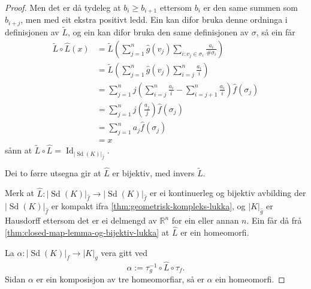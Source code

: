 \documentclass[a4paper, 12pt, norsk]{article}
\theoremstyle{plain}
\theoremstyle{definition}
\newcommand{\Rb}{\mathbb{R}}
\newcommand{\gr}[1]{ \lvert #1 \rvert } %
\newcommand{\tuple}[1]{ \left( #1 \right) } %
\DeclareMathOperator{\Sd}{Sd} %
\DeclareMathOperator{\Id}{Id} %
\begin{document}
\begin{proof}
	Men det er då tydeleg at \( b_i \geq b_{i+1} \) ettersom \( b_i \) er den same summen som \( b_{i+j} \), men med eit ekstra positivt ledd. Ein kan difor bruka denne ordninga i definisjonen av \( \tilde{L} \), og ein kan difor bruka den same definisjonen av \( \sigma \), så ein får
	\begin{align*}
		\tilde{L}\circ\hat{L}(x) &= \tilde{L}\tuple{\sum_{j=1}^n \hat{g}(v_j) \sum_{i:v_j\in\sigma_i}\frac{a_i}{\#\sigma_i}} \\
		&= \tilde{L}\tuple{\sum_{j=1}^n \hat{g}(v_j) \sum_{i=j}^n \frac{a_i}{i}} \\
		&= \sum_{j=1}^n j\tuple{\sum_{i=j}^n \frac{a_i}{i} - \sum_{i=j+1}^n \frac{a_i}{i}}\hat{f}(\sigma_j) \\
		&= \sum_{j=1}^n j\tuple{\frac{a_j}{j}}\hat{f}(\sigma_j) \\
		&= \sum_{j=1}^n a_j \hat{f}(\sigma_j) \\
		&= x
	\end{align*}
	sånn at \( \tilde{L}\circ\hat{L} = \Id_{\gr{\Sd(K)}_{\hat{f}}} \). 
	
	Dei to førre utsegna gir at \( \hat{L} \) er bijektiv, med invers \( \tilde{L} \).

	Merk at \( \hat{L}: \gr{\Sd(K)}_{\hat{f}} \to \gr{\Sd(K)}_{\hat{f}} \) er ei kontinuerleg og bijektiv avbilding der \( \gr{\Sd(K)}_{\hat{f}} \) er kompakt ifra \autoref{thm:geometrisk-kompleks-lukka}, og \( \gr{K}_{\hat{g}} \) er Hausdorff ettersom det er ei delmengd av \( \Rb^n \) for ein eller annan \( n \). Ein får då frå \autoref{thm:closed-map-lemma-og-bijektiv-lukka} at \( \hat{L} \) er ein homeomorfi.

	La \( \alpha: \gr{\Sd(K)}_f \to \gr{K}_g \) vera gitt ved
	\[
		\alpha := \tau_g^{-1} \circ \hat{L} \circ \tau_f.
	\]
	Sidan \( \alpha \) er ein komposisjon av tre homeomorfiar, så er \( \alpha \) ein homeomorfi.
\end{proof}
\end{document}
